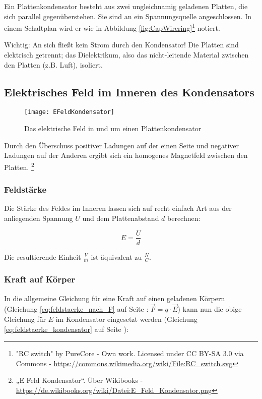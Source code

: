 Ein Plattenkondensator besteht aus zwei ungleichnamig geladenen Platten, die sich parallel gegenüberstehen. Sie sind an ein Spannungsquelle angeschlossen. In einem Schaltplan wird er wie in Abbildung \ref{fig:CapWirering}\footnote{"RC switch" by PureCore - Own work. Licensed under CC BY-SA 3.0 via Commons - \url{https://commons.wikimedia.org/wiki/File:RC_switch.svg}} notiert.

\begin{leftbar}
Wichtig: An sich fließt kein Strom durch den Kondensator! Die Platten sind elektrisch getrennt; das Dielektrikum, also das nicht-leitende Material zwischen den Platten (z.B. Luft), isoliert. 
\end{leftbar}


\subsection{Elektrisches Feld im Inneren des Kondensators}

\begin{figure}[h!]
	\centering
	\texttt{[image: EFeldKondensator]}
	\caption{Das elektrische Feld in und um einen Plattenkondensator}
\end{figure}

Durch den Überschuss  positiver Ladungen auf der einen Seite und negativer Ladungen auf der Anderen ergibt sich ein homogenes Magnetfeld zwischen den Platten. \footnote{„E Feld Kondensator“. Über Wikibooks - \url{https://de.wikibooks.org/wiki/Datei:E_Feld_Kondensator.png}}

\subsubsection{Feldstärke}

Die Stärke des Feldes im Inneren lassen sich auf recht einfach Art aus der anliegenden Spannung $U$ und dem Plattenabstand $d$ berechnen:

\begin{equation} \label{eq:feldstaerke_kondensator}
	E = \frac{U}{d}
\end{equation}

Die resultierende Einheit $\frac{V}{m}$ ist äquivalent zu $\frac{N}{C}$.

\subsubsection{Kraft auf Körper}

In die allgemeine Gleichung für eine Kraft auf einen geladenen Kör\-pern (Gleichung \ref{eq:feldstaerke_nach_F} auf Seite \pageref{eq:feldstaerke_nach_F}: $\vec{F} = q \cdot \vec{E}$) kann nun die obige Gleichung für $E$ im Kondensator eingesetzt werden (Gleichung \ref{eq:feldstaerke_kondensator} auf Seite \pageref{eq:feldstaerke_kondensator}):

